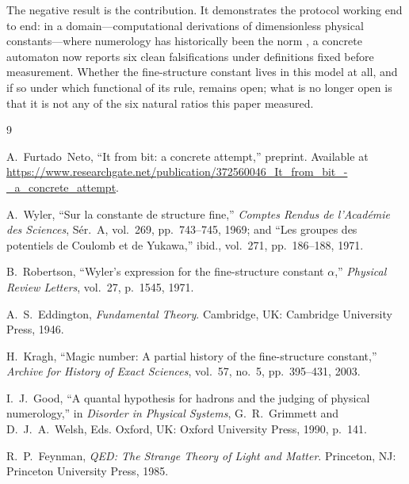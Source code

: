 \documentclass[11pt,a4paper]{article}
\begin{document}
The negative result is the contribution. It demonstrates the protocol working
end to end: in a domain---computational derivations of dimensionless physical
constants---where numerology has historically been the norm
\cite{kragh2003,good1990,feynman1985}, a concrete automaton now reports six
clean falsifications under definitions fixed before measurement. Whether the
fine-structure constant lives in this model at all, and if so under which
functional of its rule, remains open; what is no longer open is that it is
not any of the six natural ratios this paper measured.

\begin{thebibliography}{9}

A.~Furtado~Neto, ``It from bit: a concrete attempt,'' preprint. Available at
\url{https://www.researchgate.net/publication/372560046_It_from_bit_-_a_concrete_attempt}.

A.~Wyler, ``Sur la constante de structure fine,'' \emph{Comptes Rendus de
l'Acad\'emie des Sciences}, S\'er.~A, vol.~269, pp.~743--745, 1969; and
``Les groupes des potentiels de Coulomb et de Yukawa,'' ibid., vol.~271,
pp.~186--188, 1971.

B.~Robertson, ``Wyler's expression for the fine-structure constant
$\alpha$,'' \emph{Physical Review Letters}, vol.~27, p.~1545, 1971.

A.~S.~Eddington, \emph{Fundamental Theory}. Cambridge, UK: Cambridge
University Press, 1946.

H.~Kragh, ``Magic number: A partial history of the fine-structure
constant,'' \emph{Archive for History of Exact Sciences}, vol.~57, no.~5,
pp.~395--431, 2003.

I.~J.~Good, ``A quantal hypothesis for hadrons and the judging of physical
numerology,'' in \emph{Disorder in Physical Systems}, G.~R.~Grimmett and
D.~J.~A.~Welsh, Eds. Oxford, UK: Oxford University Press, 1990, p.~141.

R.~P.~Feynman, \emph{QED: The Strange Theory of Light and Matter}.
Princeton, NJ: Princeton University Press, 1985.

\end{thebibliography}
\end{document}
